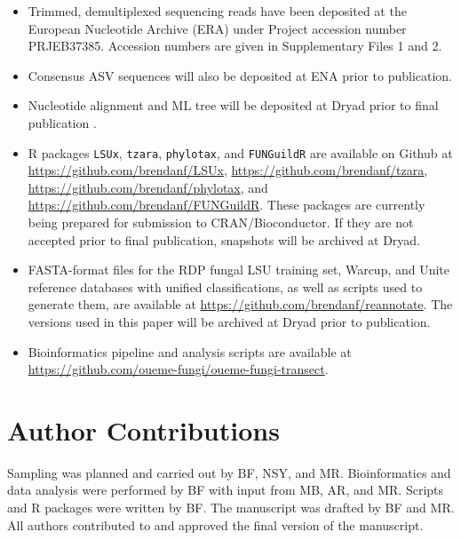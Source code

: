 \documentclass[
  12pt,
]{article}
\providecommand{\tightlist}{%
  \setlength{\itemsep}{0pt}\setlength{\parskip}{0pt}}
\begin{document}
\begin{itemize}
\tightlist
\item
  Trimmed, demultiplexed sequencing reads have been deposited at the European Nucleotide Archive (ERA) under Project accession number PRJEB37385. Accession numbers are given in Supplementary Files 1 and 2.
\item
  Consensus ASV sequences will also be deposited at ENA prior to publication.
\item
  Nucleotide alignment and ML tree will be deposited at Dryad prior to final publication \autocite{furneauxdata2020}.
\item
  R packages \texttt{LSUx}, \texttt{tzara}, \texttt{phylotax}, and \texttt{FUNGuildR} are available on Github at \url{https://github.com/brendanf/LSUx}, \url{https://github.com/brendanf/tzara}, \url{https://github.com/brendanf/phylotax}, and \url{https://github.com/brendanf/FUNGuildR}.
  These packages are currently being prepared for submission to CRAN/Bioconductor.
  If they are not accepted prior to final publication, snapshots will be archived at Dryad.
\item
  FASTA-format files for the RDP fungal LSU training set, Warcup, and Unite reference databases with unified classifications, as well as scripts used to generate them, are available at \url{https://github.com/brendanf/reannotate}. The versions used in this paper will be archived at Dryad prior to publication.
\item
  Bioinformatics pipeline and analysis scripts are available at \url{https://github.com/oueme-fungi/oueme-fungi-transect}.
\end{itemize}

\hypertarget{author-contributions}{%
\section*{Author Contributions}\label{author-contributions}}

Sampling was planned and carried out by BF, NSY, and MR.
Bioinformatics and data analysis were performed by BF with input from MB, AR, and MR.
Scripts and R packages were written by BF.
The manuscript was drafted by BF and MR.
All authors contributed to and approved the final version of the manuscript.

\processdelayedfloats
\end{document}
